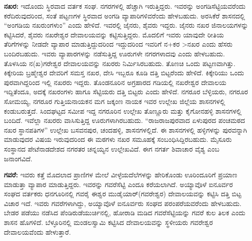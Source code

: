 \vskip 3pt

\textbf{ನಖರ:} ಇದೊಂದು ಸ್ಥಿರವಾದ ವರ್ತಕ ಸಂಘ. ನಗರಗಳಲ್ಲಿ ಹೆಚ್ಚಾಗಿ ಇರುತ್ತಿದ್ದರು. ಇವರನ್ನು ಅಂಗಡಿಸೆಟ್ಟಿಯವ\-ರೆಂದು ಕರೆದಿರುವುದರಿಂದ, ಸಂತೆ ಪಟ್ಟಣಗಳ ಸ್ಥಿರವಾದ ಅಂಗಡಿ ವ್ಯಾಪಾರಿಗಳಿವರೆಂದು ಹೇಳಬಹುದು. ಅರಸಿಕೆರೆ ಶಾಸನದಲ್ಲಿ “ಅಂಗಡಿಯ ನಖರುಂಗಳುಂ” ಎಂದು ಹೇಳಿದೆ. ಇವರಲ್ಲಿ ಜೈನರು, ಶೈವರು ಇದ್ದರು. ಜೈನರು ನಖರ ಜಿನಾಲಯಗಳನ್ನು ಕಟ್ಟಿಸಿದರೆ, ಶೈವರು ನಖರೇಶ್ವರ ದೇವಾಲಯವನ್ನು ಕಟ್ಟಿಸುತ್ತಿದ್ದರು. ಮೊದಲಿಗೆ ಇವರು ಯಾವುದೇ ರೀತಿಯ ತೆರಿಗೆಗಳನ್ನು ನೀಡದೇ ವ್ಯಾಪಾರ ಮಾಡುತ್ತಿದ್ದುದರಿಂದ ಇದ್ದುದರಿಂದ ಇವರಿಗೆ ನ+ಕರ \textgreater  ನಖರ ಎಂದು ಹೆಸರು ಬಂದಿರಬಹುದು. ಇವರು ವ್ಯಾಪಾರಗಳನ್ನು ನಡೆಸುತ್ತಿದ್ದ ಊರುಗಳೇ ನಗರಗಳಾದವು ಎಂದು ಹೇಳಬಹುದು. ತೊಳಸಿಯ ನ(ಖ)ಗರೇಶ್ವರ ದೇವಾಲಯವನ್ನು ನಖರರು ನಿರ್ಮಿಸಿರಬಹುದು. ತೊಣಚಿ ಒಂದು ಪಟ್ಟಣವಾಗಿತ್ತು. ಕಿಕ್ಕೇರಿಯ ಬ್ರಹ್ಮೇಶ್ವರ ದೇವರಿಗೆ ಸಮಸ್ತ ನಖರ, ದೇಸಿ ಇಬ್ಬರೂ ಕೂಡಿ ದತ್ತಿ ಬಿಟ್ಟರೆಂದು ಹೇಳಿದೆ. ಕಿಕ್ಕೇರಿಯು ಒಂದು ಪುರವಾಗಿದ್ದರಿಂದ ಇಲ್ಲಿ ನಖರರು ಇದ್ದರು. ತೊಂಡನೂರಿನ ಅಗ್ರಹಾರದ ಗಡಿಯಲ್ಲಿ ನಖರೇಶ್ವರ ದೇವಾಲಯ ಇದ್ದಿತೆಂದೂ, ಅದಕ್ಕೆ ನಖರಂಗಳು ಹಾಗೂ ಸೆಟ್ಟಿಯರು ದತ್ತಿ ಬಿಟ್ಟರು ಎಂದು ಹೇಳಿದೆ. ನಗರೂರ ಬೆಳ್ಳಿಯರು, ನಗರೂರ ಸೋಮಯ್ಯ, ನಗರೂರ ಗುತ್ತಿಯನಾಯಕನ ಮಗ ಜಕ್ಕಂಣ ನಾಯಕ ಇವರ ಉಲ್ಲೇಖ ಜಿಲ್ಲೆಯ ಶಾಸನಗಳಲ್ಲಿ ಕಂಡುಬರುತ್ತದೆ. ಸಿಂದಘಟ್ಟದ ಸಮೀಪ ಇದ್ದ ನಗರೂರಿನ ಉಲ್ಲೇಖ ತೊಣ್ಣೂರು ಮತ್ತು ಕೈಗೋನಹಳ್ಳಿ ಶಾಸನಗಳಲ್ಲಿ ಬಂದಿದೆ. ಇವೆಲ್ಲಾ ನಖರರು ವಾಸಿಸುತ್ತಿದ್ದ ಊರುಗಳಾಗಿರಬಹುದು. “ರಾಜರಾಜಪುರವಾದ ಏಳುಪುರದ ಪಂಚಮಠದ ನಖರ ಸ್ಥಾನಪತಿಗಳ” ಉಲ್ಲೇಖ ಬಸವನಪುರ, ಚಂದಹಳ್ಳಿ, ಶಾಸನಗಳಲ್ಲಿದೆ. ಈ ಶಾಸನಗಳಲ್ಲಿ ಹಳ್ಳಿಗಳನ್ನು ಪುರವನ್ನಾಗಿ ಮಾಡುವುದರ ವಿಷಯ ಇರುವುದರಿಂದ ಈ ಮಠಗಳು ನಖರ ಸಮೂಹಕ್ಕೆ ಸಂಬಂಧಿಸಿದ್ದಿರಬಹುದು. ಮೈಸೂರು ಸಂಸ್ಥಾನದ ಪೇಟೆನಾಡದೇಶದ ನಗರತರ ಚನ್ನಯ್ಯನ ಉಲ್ಲೇಖವಿದೆ.  ಈಗ ನಗರ್ತ ಶಿವಾಚಾರ ವೈಶ್ಯ ಎಂಬ ಜನಾಂಗವಿದೆ.

\vskip 3pt

\textbf{ಗವರೆ:} ಇವರು ಕತ್ತೆ ಮೊದಲಾದ ಪ್ರಾಣಿಗಳ ಮೇಲೆ ವೀಳ್ಳೆಯದೆಲೆಗಳನ್ನು ಹೇರಿಕೊಂಡು ಊರಿಂದೂರಿಗೆ ಪ್ರಯಾಣ ಮಾಡುತ್ತಾ ವ್ಯಾಪಾರ ಮಾಡುತ್ತಿದ್ದರು. ಇವರನ್ನು ಗವರೆಸೆಟ್ಟಿ ಎಂದೂ ಕರೆಯಲಾಗಿದೆ. ಅಯ್ಯಾವೊಳೆ ಐನೂರ್ವರ ಸಂಘದ ವರ್ತಕರು ಧನಗೂರಿನಲ್ಲಿ ಗವರೈ ಈಶ್ವರ ಮುಡೈಯಾರ್​(ಗವರೇಶ್ವರ) ದೇವಾಲಯವನ್ನು ಕಟ್ಟಿಸಿ ದತ್ತಿ ಬಿಟ್ಟ ವಿಚಾರ ಇದೆ. ಇವರು ಗವರೆಗಳಾಗಿದ್ದು, ಅಯ್ಯಾವೊಳೆ ಐನೂರ್ವರು ಸಂಘದ ಪರಂಪರೆಯವರೆಂದು ಹೇಳಬಹುದು. ಬೇಡರ ಪಡೆಯು ನಡೆಸಿದ ಪೆಂಡಿರುಡೆಯುರ್ಚಿನಲ್ಲಿ, ಹೋರಾಡಿ ಮಡಿದ ಗವರೆಸೆಟ್ಟಿಯನ್ನು ಗವರೆ ಕುಲ ತಿಲಕ ಎಂದು ಶಾಸನ ಹೊಗಳಿದೆ. ಬೆಳ್ಳೂರಿನಲ್ಲಿ ಮಂಡಲಸ್ವಾಮಿ ಕಟ್ಟಿಸಿದ ದೇವಾಲಯವನ್ನು ಸ್ಥಳೀಯರು ಗವರೇಶ್ವರ ದೇವಾಲಯವೆಂದು ಹೇಳುತ್ತಾರೆ.

